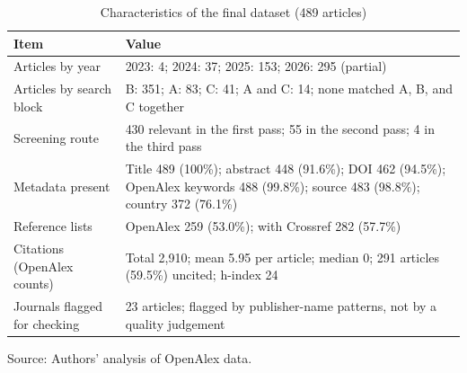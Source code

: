 \begin{table}[htbp]
\centering
\footnotesize
\caption{Characteristics of the final dataset (489 articles)}
\label{tab:data}
\begin{tabularx}{\textwidth}{YY}
\hline
\textbf{Item} & \textbf{Value} \\ \hline
Articles by year & 2023: 4; 2024: 37; 2025: 153; 2026: 295 (partial) \\
Articles by search block & B: 351; A: 83; C: 41; A and C: 14; none matched A, B, and C together \\
Screening route & 430 relevant in the first pass; 55 in the second pass; 4 in the third pass \\
Metadata present & Title 489 (100\%); abstract 448 (91.6\%); DOI 462 (94.5\%); OpenAlex keywords 488 (99.8\%); source 483 (98.8\%); country 372 (76.1\%) \\
Reference lists & OpenAlex 259 (53.0\%); with Crossref 282 (57.7\%) \\
Citations (OpenAlex counts) & Total 2{,}910; mean 5.95 per article; median 0; 291 articles (59.5\%) uncited; h-index 24 \\
Journals flagged for checking & 23 articles; flagged by publisher-name patterns, not by a quality judgement \\ \hline
\end{tabularx}
\par\vspace{2pt}Source: Authors' analysis of OpenAlex data.
\end{table}

